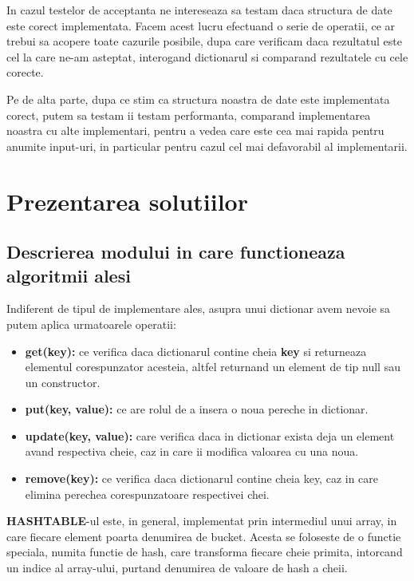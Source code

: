 \documentclass[runningheads]{llncs}
\begin{document}
In cazul testelor de acceptanta ne intereseaza sa testam daca structura de date este corect implementata. Facem acest lucru efectuand o serie de operatii, ce ar trebui sa acopere toate cazurile posibile,  dupa care verificam daca rezultatul este cel la care ne-am asteptat, interogand dictionarul si comparand rezultatele cu cele corecte.

Pe de alta parte, dupa ce stim ca structura noastra de date este implementata corect, putem sa testam ii testam performanta, comparand implementarea noastra cu alte implementari, pentru a vedea care este cea mai rapida pentru anumite input-uri, in particular pentru cazul cel mai defavorabil al implementarii.

\section{Prezentarea solutiilor}

\subsection{Descrierea modului in care functioneaza algoritmii alesi}

Indiferent de tipul de implementare ales, asupra unui dictionar avem nevoie sa putem aplica urmatoarele operatii: 
\begin{itemize}
\item \textbf{get(key):} ce verifica daca dictionarul contine cheia \textbf{key} si returneaza elementul corespunzator acesteia, altfel returnand un element de tip null sau un constructor.
\vspace{\baselineskip}
\item \textbf{put(key, value):} ce are rolul de a insera o noua pereche in dictionar.
\vspace{\baselineskip}
\item \textbf{update(key, value):} care verifica daca in dictionar exista deja un element avand respectiva cheie, caz in care ii modifica valoarea cu una noua.
\vspace{\baselineskip}
\item \textbf{remove(key):} ce verifica daca dictionarul contine cheia key, caz in care elimina perechea corespunzatoare respectivei chei.
\end{itemize}
\vspace{\baselineskip}

\textbf{HASHTABLE}-ul este, in general, implementat prin intermediul unui array, in care fiecare element poarta denumirea de bucket. Acesta se foloseste de o functie speciala, numita functie de hash, care transforma fiecare cheie primita, intorcand un indice al array-ului, purtand denumirea de valoare de hash a cheii.
\end{document}
